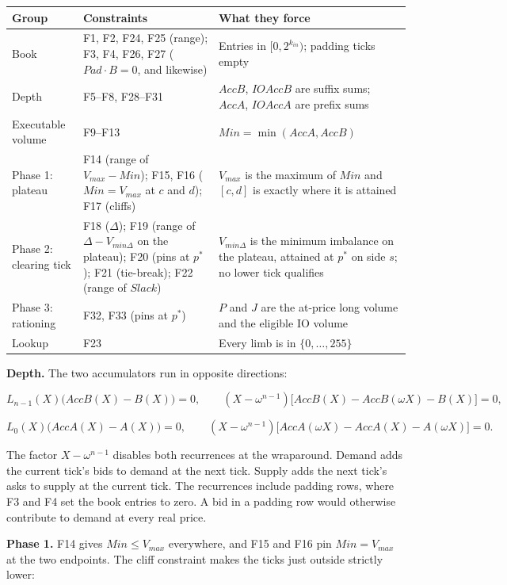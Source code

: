 \begin{longtable}[]{@{}lll@{}}
\toprule\noalign{}
Group & Constraints & What they force \\
\midrule\noalign{}
\endhead
\bottomrule\noalign{}
\endlastfoot
Book & F1, F2, F24, F25 (range); F3, F4, F26, F27 (\(Pad \cdot B = 0\), and likewise) & Entries in \([0, 2^{k_{in}})\); padding ticks empty \\
Depth & F5--F8, F28--F31 & \(AccB\), \(IOAccB\) are suffix sums; \(AccA\), \(IOAccA\) are prefix sums \\
Executable volume & F9--F13 & \(Min = \min(AccA, AccB)\) \\
Phase 1: plateau & F14 (range of \(V_{max} - Min\)); F15, F16 (\(Min = V_{max}\) at \(c\) and \(d\)); F17 (cliffs) & \(V_{max}\) is the maximum of \(Min\) and \([c,d]\) is exactly where it is attained \\
Phase 2: clearing tick & F18 (\(\Delta\)); F19 (range of \(\Delta - V_{min\Delta}\) on the plateau); F20 (pins at \(p^*\)); F21 (tie-break); F22 (range of \(Slack\)) & \(V_{min\Delta}\) is the minimum imbalance on the plateau, attained at \(p^*\) on side \(s\); no lower tick qualifies \\
Phase 3: rationing & F32, F33 (pins at \(p^*\)) & \(P\) and \(J\) are the at-price long volume and the eligible IO volume \\
Lookup & F23 & Every limb is in \(\{0, \ldots, 255\}\) \\
\end{longtable}

\textbf{Depth.} The two accumulators run in opposite directions:

\[L_{n-1}(X)\big(AccB(X) - B(X)\big) = 0, \qquad (X - \omega^{n-1})\big[AccB(X) - AccB(\omega X) - B(X)\big] = 0, \tag{F5, F7}\]

\[L_{0}(X)\big(AccA(X) - A(X)\big) = 0, \qquad (X - \omega^{n-1})\big[AccA(\omega X) - AccA(X) - A(\omega X)\big] = 0. \tag{F6, F8}\]

The factor \(X-\omega^{n-1}\) disables both recurrences at the wraparound. Demand adds the current tick's bids to demand at the next tick. Supply adds the next tick's asks to supply at the current tick. The recurrences include padding rows, where F3 and F4 set the book entries to zero. A bid in a padding row would otherwise contribute to demand at every real price.

\textbf{Phase 1.} F14 gives \(Min \le V_{max}\) everywhere, and F15 and F16 pin \(Min = V_{max}\) at the two endpoints. The cliff constraint makes the ticks just outside strictly lower:

